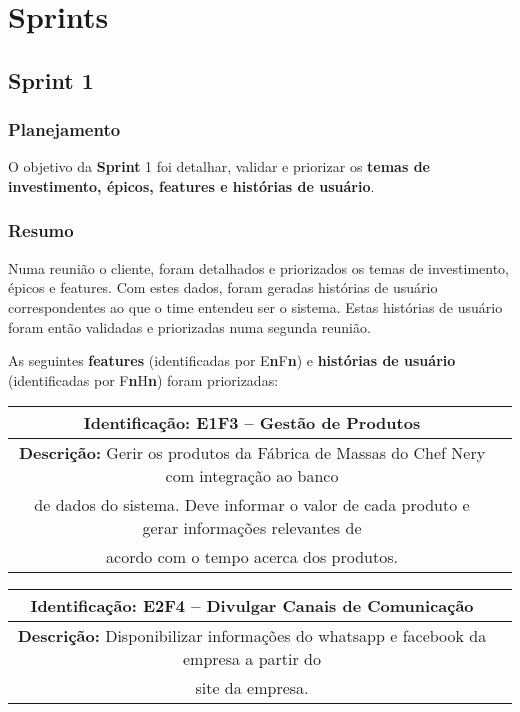 
\chapter[Sprints]{Sprints}


\section{\large{Sprint 1}}

\subsection{Planejamento}
    O objetivo da \textbf{Sprint} 1 foi detalhar, validar e priorizar os \textbf{temas de investimento, épicos, features e histórias de usuário}.

\subsection{Resumo}
    Numa reunião o cliente, foram detalhados e priorizados os temas de investimento, épicos e features. Com estes dados, foram geradas histórias de usuário correspondentes ao que o time entendeu ser o sistema. Estas histórias de usuário foram então validadas e priorizadas numa segunda reunião.

    As seguintes \textbf{features} (identificadas por E\textbf{n}F\textbf{n}) e \textbf{histórias de usuário} (identificadas por F\textbf{n}H\textbf{n}) foram priorizadas:

    \begin{table}[H]
    \centering
    \begin{tabular}{|c|p{10cm}}
    \hline
    \textbf{Identificação:} E1F3 – Gestão de Produtos \\
    \hline
    \textbf{Descrição:} Gerir os produtos da Fábrica de Massas do Chef Nery com integração ao banco\\
     de dados do sistema. Deve informar o valor de cada produto e gerar informações relevantes de \\
     acordo com o tempo acerca dos produtos.    \\
    \hline
    \end{tabular}
    \end{table}

    \begin{table}[H]
    \centering
    \begin{tabular}{|c|p{10cm}}
    \hline
    \textbf{Identificação:} E2F4 – Divulgar Canais de Comunicação \\
    \hline
    \textbf{Descrição:} Disponibilizar informações do whatsapp e facebook da empresa a partir do \\
    site da empresa.\\
    \hline
    \end{tabular}
    \end{table}

